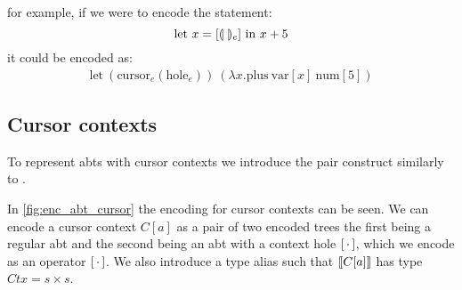 \documentclass[sigplan,anonymous,review]{acmart}
\begin{document}
for example, if we were to encode the statement:
\begin{equation*}
        \text{let $x=[\llparenthesis \ \rrparenthesis_e]$ in $x+5$}
    \end{equation*}
    it could be encoded as:
    \begin{align*} 
        \text{let} \ (\text{cursor}_e(\text{hole}_e)) \ (\lambda x . \text{plus} \ \text{var}[x] \ \text{num}[5])
  \end{align*}




\subsection{Cursor contexts}\label{sec:enc_cursor_contexts}

To represent abts with cursor contexts we introduce the pair construct similarly to \cite{types_programming_languages}.


In \cref{fig:enc_abt_cursor} the encoding for cursor contexts can be seen. We can encode a cursor context $C[a]$ as a pair of two encoded trees the first being a regular abt and the second being an abt with a context hole $[ \, \cdot \, ]$, which we encode as an operator $[ \, \cdot \, ]$. We also introduce a type alias such that $\llbracket C[a] \rrbracket$ has type $Ctx = s \times s$.
\end{document}
